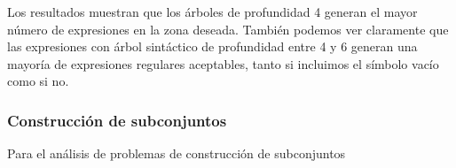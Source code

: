 

Los resultados muestran que los árboles de profundidad 4 generan el mayor número de expresiones en la zona deseada.
También podemos ver claramente que las expresiones con árbol sintáctico de profundidad entre 4 y 6 generan una mayoría de expresiones regulares aceptables, tanto si incluimos el símbolo vacío como si no.

\subsubsection{Construcción de subconjuntos}

Para el análisis de problemas de construcción de subconjuntos 

